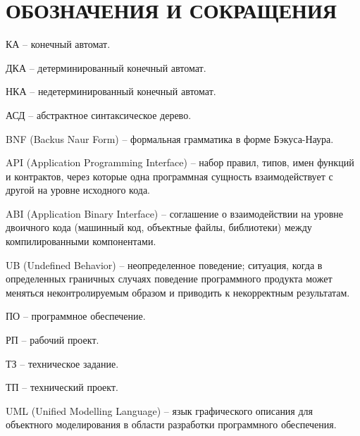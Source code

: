 \section*{ОБОЗНАЧЕНИЯ И СОКРАЩЕНИЯ}

КА -- конечный автомат.

ДКА -- детерминированный конечный автомат.

НКА -- недетерминированный конечный автомат.

АСД -- абстрактное синтаксическое дерево.

BNF (Backus Naur Form) -- формальная грамматика в форме Бэкуса-Наура.

API (Application Programming Interface) -- набор правил, типов, имен функций и контрактов, через которые одна программная сущность взаимодействует с другой на уровне исходного кода.

ABI (Application Binary Interface) -- соглашение о взаимодействии на уровне двоичного кода (машинный код, объектные файлы, библиотеки) между компилированными компонентами.

UB (Undefined Behavior) -- неопределенное поведение; ситуация, когда в определенных граничных случаях поведение программного продукта может меняться неконтролируемым образом и приводить к некорректным результатам.

ПО -- программное обеспечение.

РП -- рабочий проект.

ТЗ -- техническое задание.

ТП -- технический проект.

UML (Unified Modelling Language) -- язык графического описания для объектного моделирования в области разработки программного обеспечения.
